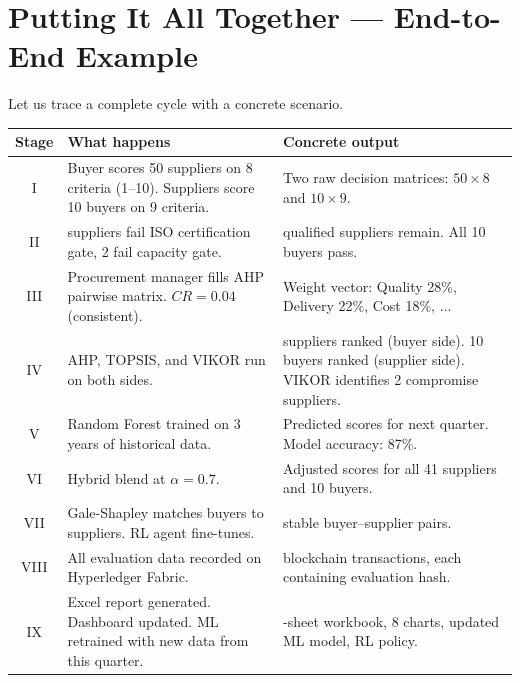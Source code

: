 \documentclass[11pt]{article}
\begin{document}
\section{Putting It All Together --- End-to-End Example}

Let us trace a complete cycle with a concrete scenario.

\begin{center}
\small
\begin{tabularx}{\textwidth}{c >{\raggedright\arraybackslash}p{2.8cm} >{\raggedright\arraybackslash}X}
\toprule
\textbf{Stage} & \textbf{What happens} & \textbf{Concrete output} \\
\midrule
I & Buyer scores 50 suppliers on 8 criteria (1--10). Suppliers score 10 buyers on 9 criteria. & Two raw decision matrices: $50 \times 8$ and $10 \times 9$. \\
\addlinespace
II & 7 suppliers fail ISO certification gate, 2 fail capacity gate. & 41 qualified suppliers remain. All 10 buyers pass. \\
\addlinespace
III & Procurement manager fills AHP pairwise matrix. $CR = 0.04$ (consistent). & Weight vector: Quality 28\%, Delivery 22\%, Cost 18\%, $\ldots$ \\
\addlinespace
IV & AHP, TOPSIS, and VIKOR run on both sides. & 41 suppliers ranked (buyer side). 10 buyers ranked (supplier side). VIKOR identifies 2 compromise suppliers. \\
\addlinespace
V & Random Forest trained on 3 years of historical data. & Predicted scores for next quarter. Model accuracy: 87\%. \\
\addlinespace
VI & Hybrid blend at $\alpha = 0.7$. & Adjusted scores for all 41 suppliers and 10 buyers. \\
\addlinespace
VII & Gale-Shapley matches buyers to suppliers. RL agent fine-tunes. & 10 stable buyer--supplier pairs. \\
\addlinespace
VIII & All evaluation data recorded on Hyperledger Fabric. & 10 blockchain transactions, each containing evaluation hash. \\
\addlinespace
IX & Excel report generated. Dashboard updated. ML retrained with new data from this quarter. & 15-sheet workbook, 8 charts, updated ML model, RL policy. \\
\bottomrule
\end{tabularx}
\end{center}

\end{document}
